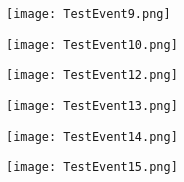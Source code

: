 \begin{figure}[h!]
    \begin{center}
        \texttt{[image: TestEvent9.png]}
    \end{center}
\end{figure}\begin{figure}[h!]
    \begin{center}
        \texttt{[image: TestEvent10.png]}
    \end{center}
\end{figure}
\begin{figure}[h!]
    \begin{center}
        \texttt{[image: TestEvent12.png]}
    \end{center}
\end{figure}
\begin{figure}[h!]
    \begin{center}
        \texttt{[image: TestEvent13.png]}
    \end{center}
\end{figure}
\begin{figure}[h!]
    \begin{center}
        \texttt{[image: TestEvent14.png]}
    \end{center}
\end{figure}
\begin{figure}[h!]
    \begin{center}
        \texttt{[image: TestEvent15.png]}
    \end{center}
\end{figure}

\clearpage